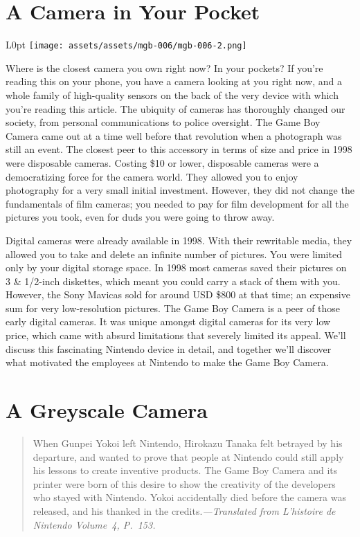 \documentclass{book}
\begin{document}
\newpage\FloatBarrier\needspace{10mm}\section*{A Camera in Your Pocket}\nopagebreak[4]
\begin{wrapfigure}{L}{0pt} \texttt{[image: assets/assets/mgb-006/mgb-006-2.png]}\end{wrapfigure}
Where is the closest camera you own right now? In your pockets? If you’re reading this on your phone, you have a camera looking at you right now, and a whole family of high-quality sensors on the back of the very device with which you’re reading this article. The ubiquity of cameras has thoroughly changed our society, from personal communications to police oversight. The Game Boy Camera came out at a time well before that revolution when a photograph was still an event. The closest peer to this accessory in terms of size and price in 1998 were disposable cameras. Costing \$10 or lower, disposable cameras were a democratizing force for the camera world. They allowed you to enjoy photography for a very small initial investment. However, they did not change the fundamentals of film cameras; you needed to pay for film development for all the pictures you took, even for duds you were going to throw away.

Digital cameras were already available in 1998. With their rewritable media, they allowed you to take and delete an infinite number of pictures. You were limited only by your digital storage space. In 1998 most cameras saved their pictures on 3 \& 1/2-inch diskettes, which meant you could carry a stack of them with you. However, the Sony Mavicas sold for around USD \$800 at that time; an expensive sum for very low-resolution pictures. The Game Boy Camera is a peer of those early digital cameras. It was unique amongst digital cameras for its very low price, which came with absurd limitations that severely limited its appeal. We’ll discuss this fascinating Nintendo device in detail, and together we’ll discover what motivated the employees at Nintendo to make the Game Boy Camera.

\FloatBarrier\needspace{10mm}\section*{A Greyscale Camera}\nopagebreak[4]

\begin{quote}When Gunpei Yokoi left Nintendo, Hirokazu Tanaka felt betrayed by his departure, and wanted to prove that people at Nintendo could still apply his lessons to create inventive products. The Game Boy Camera and its printer were born of this desire to show the creativity of the developers who stayed with Nintendo. Yokoi accidentally died before the camera was released, and his thanked in the credits.\newline \emph{—Translated from \emph{L’histoire de Nintendo Volume~4}, P.~153.}\end{quote} \par
\end{document}
